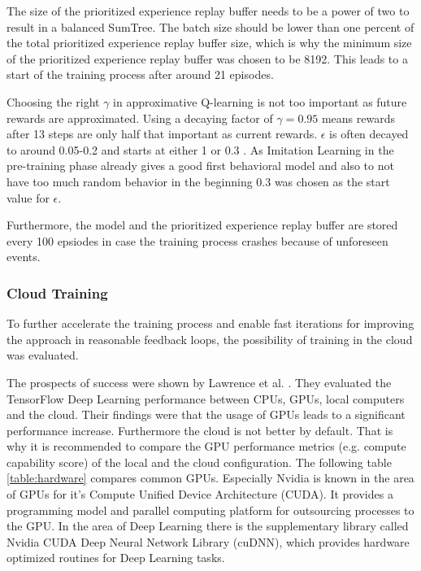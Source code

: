 The size of the prioritized experience replay buffer needs to be a power of two to result in a balanced SumTree. The batch size should be lower than one percent of the total prioritized experience replay buffer size, which is why the minimum size of the prioritized experience replay buffer was chosen to be 8192. This leads to a start of the training process after around 21 episodes. 

Choosing the right $\gamma$ in approximative Q-learning is not too important as future rewards are approximated. Using a decaying factor of $\gamma=0.95$ means rewards after 13 steps are only half that important as current rewards. $\epsilon$ is often decayed to around 0.05-0.2 and starts at either 1 or 0.3 \cite{Hessel2017, Kormelink2018, Franca2019}. As Imitation Learning in the pre-training phase already gives a good first behavioral model and also to not have too much random behavior in the beginning 0.3 was chosen as the start value for $\epsilon$. 

Furthermore, the model and the  prioritized experience replay buffer are stored every 100 epsiodes in case the training process crashes because of unforeseen events. 

\subsubsection{Cloud Training}
\label{ch:approachBf}

To further accelerate the training process and enable fast iterations for im\-pro\-ving the approach in reasonable feedback loops, the possibility of training in the cloud was evaluated. 

The prospects of success were shown by Lawrence et al. \cite{Lawrence2017ComparingTD}. They evaluated the TensorFlow Deep Learning performance between CPUs, GPUs, local computers and the cloud. Their findings were that the usage of GPUs leads to a significant performance increase. Furthermore the cloud is not better by default. That is why it is recommended to compare the GPU performance metrics (e.g. compute capability score) of the local and the cloud configuration. The following table \ref{table:hardware} compares common GPUs.
Especially Nvidia is known in the area of GPUs for it's Compute Unified Device Ar\-chi\-tec\-tu\-re (CUDA). It provides a programming model and parallel computing platform for outsourcing processes to the GPU. In the area of Deep Learning there is the supplementary library called Nvidia CUDA Deep Neural Network Library (cuDNN), which provides hardware optimized routines for Deep Learning tasks.

